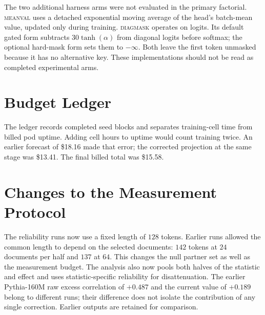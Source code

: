 \documentclass{article} %
\begin{document}
The two additional harness arms were not evaluated in the primary factorial.
\textsc{meanval} uses a detached exponential moving average of the head's
batch-mean value, updated only during training. \textsc{diagmask} operates
on logits. Its default gated form subtracts $30\tanh(\alpha)$ from diagonal
logits before softmax; the optional hard-mask form sets them to $-\infty$.
Both leave the first token unmasked because it has no alternative key.
These implementations should not be read as completed experimental arms.

\section{Budget Ledger}
\label{app:budget}

The ledger records completed seed blocks and separates training-cell time
from billed pod uptime. Adding cell hours to uptime would count training
twice. An earlier forecast of \$18.16 made that error; the corrected
projection at the same stage was \$13.41. The final billed total was
\$15.58.

\section{Changes to the Measurement Protocol}
\label{app:deviations}

The reliability runs now use a fixed length of $128$ tokens. Earlier runs
allowed the common length to depend on the selected documents: $142$ tokens
at $24$ documents per half and $137$ at $64$. This changes the null partner
set as well as the measurement budget. The analysis also now pools both
halves of the statistic and effect and uses statistic-specific reliability
for disattenuation. The earlier Pythia-160M raw excess correlation of
$+0.487$ and the current value of $+0.189$ belong to different runs;
their difference does not isolate the contribution of any single correction.
Earlier outputs are retained for comparison.
\end{document}
